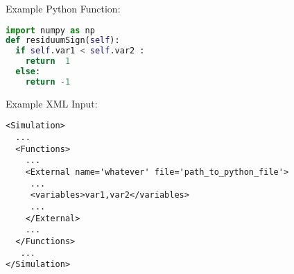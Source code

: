 Example Python Function:
\begin{lstlisting}[language=python]
import numpy as np
def residuumSign(self):
  if self.var1 < self.var2 :
    return  1
  else:
    return -1
\end{lstlisting}

Example XML Input:
\begin{lstlisting}[style=XML,morekeywords={name,file}] %moreemph={name,file}]
<Simulation>
  ...
  <Functions>
    ...
    <External name='whatever' file='path_to_python_file'>
     ...
     <variables>var1,var2</variables>
     ...
    </External>
    ...
  </Functions>
   ...
</Simulation>
\end{lstlisting}
